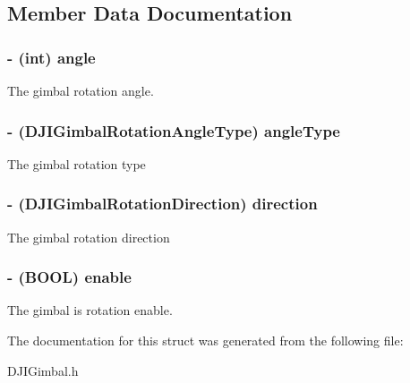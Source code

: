 \subsection{Member Data Documentation}
\hypertarget{struct_d_j_i_gimbal_rotation_abbcc4b75198c5a4b913ad1c61c47e787}{
\subsubsection[{angle}]{\setlength{\rightskip}{0pt plus 5cm}-\/ (int) angle\hspace{0.3cm}{\ttfamily [protected]}}}\label{struct_d_j_i_gimbal_rotation_abbcc4b75198c5a4b913ad1c61c47e787}
The gimbal rotation angle. \hypertarget{struct_d_j_i_gimbal_rotation_a819cec735930ba905d227b6a73f55d56}{
\subsubsection[{angle\+Type}]{\setlength{\rightskip}{0pt plus 5cm}-\/ (D\+J\+I\+Gimbal\+Rotation\+Angle\+Type) angle\+Type\hspace{0.3cm}{\ttfamily [protected]}}}\label{struct_d_j_i_gimbal_rotation_a819cec735930ba905d227b6a73f55d56}
The gimbal rotation type \hypertarget{struct_d_j_i_gimbal_rotation_aeda6599ce4fbdd86a7a474e481f601ac}{
\subsubsection[{direction}]{\setlength{\rightskip}{0pt plus 5cm}-\/ (D\+J\+I\+Gimbal\+Rotation\+Direction) direction\hspace{0.3cm}{\ttfamily [protected]}}}\label{struct_d_j_i_gimbal_rotation_aeda6599ce4fbdd86a7a474e481f601ac}
The gimbal rotation direction \hypertarget{struct_d_j_i_gimbal_rotation_ad6555675f7a142ff111b99d3ae214a5c}{
\subsubsection[{enable}]{\setlength{\rightskip}{0pt plus 5cm}-\/ (B\+O\+O\+L) enable\hspace{0.3cm}{\ttfamily [protected]}}}\label{struct_d_j_i_gimbal_rotation_ad6555675f7a142ff111b99d3ae214a5c}
The gimbal is rotation enable. 

The documentation for this struct was generated from the following file\+:\begin{DoxyCompactItemize}
\item 
D\+J\+I\+Gimbal.\+h\end{DoxyCompactItemize}
